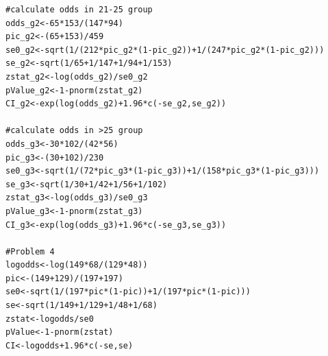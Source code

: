 \documentclass[10pt,letterpaper]{article}
\begin{document}
\begin{lstlisting}
#calculate odds in 21-25 group
odds_g2<-65*153/(147*94)
pic_g2<-(65+153)/459
se0_g2<-sqrt(1/(212*pic_g2*(1-pic_g2))+1/(247*pic_g2*(1-pic_g2)))
se_g2<-sqrt(1/65+1/147+1/94+1/153)
zstat_g2<-log(odds_g2)/se0_g2
pValue_g2<-1-pnorm(zstat_g2)
CI_g2<-exp(log(odds_g2)+1.96*c(-se_g2,se_g2))

#calculate odds in >25 group
odds_g3<-30*102/(42*56)
pic_g3<-(30+102)/230
se0_g3<-sqrt(1/(72*pic_g3*(1-pic_g3))+1/(158*pic_g3*(1-pic_g3)))
se_g3<-sqrt(1/30+1/42+1/56+1/102)
zstat_g3<-log(odds_g3)/se0_g3
pValue_g3<-1-pnorm(zstat_g3)
CI_g3<-exp(log(odds_g3)+1.96*c(-se_g3,se_g3))

#Problem 4
logodds<-log(149*68/(129*48))
pic<-(149+129)/(197+197)
se0<-sqrt(1/(197*pic*(1-pic))+1/(197*pic*(1-pic)))
se<-sqrt(1/149+1/129+1/48+1/68)
zstat<-logodds/se0
pValue<-1-pnorm(zstat)
CI<-logodds+1.96*c(-se,se)

\end{lstlisting}
\end{document}
